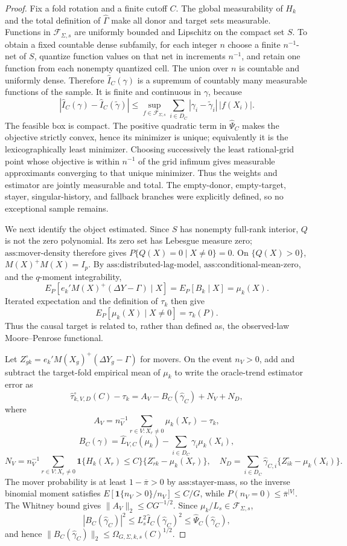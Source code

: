 \documentclass{article}
\begin{document}
\begin{proof}
Fix a fold rotation and a finite cutoff \(C\). The global measurability of \(H_k\) and the total definition of \(\widehat\Gamma\) make all donor and target sets measurable. Functions in \(\mathcal F_{\Sigma,s}\) are uniformly bounded and Lipschitz on the compact set \(S\). To obtain a fixed countable dense subfamily, for each integer \(n\) choose a finite \(n^{-1}\)-net of \(S\), quantize function values on that net in increments \(n^{-1}\), and retain one function from each nonempty quantized cell. The union over \(n\) is countable and uniformly dense. Therefore \(\widehat I_C(\gamma)\) is a supremum of countably many measurable functions of the sample. It is finite and continuous in \(\gamma\), because
\[
|\widehat I_C(\gamma)-\widehat I_C(\widetilde\gamma)|
\le \sup_{f\in\mathcal F_{\Sigma,s}}\sum_{i\in D_C}|\gamma_i-\widetilde\gamma_i|\,|f(X_i)|.
\]
The feasible box is compact. The positive quadratic term in \(\widehat\Psi_C\) makes the objective strictly convex, hence its minimizer is unique; equivalently it is the lexicographically least minimizer. Choosing successively the least rational-grid point whose objective is within \(n^{-1}\) of the grid infimum gives measurable approximants converging to that unique minimizer. Thus the weights and estimator are jointly measurable and total. The empty-donor, empty-target, stayer, singular-history, and fallback branches were explicitly defined, so no exceptional sample remains.

We next identify the object estimated. Since \(S\) has nonempty full-rank interior, \(Q\) is not the zero polynomial. Its zero set has Lebesgue measure zero; \(\text{ass:mover-density}\) therefore gives \(P\{Q(X)=0\mid X\ne0\}=0\). On \(\{Q(X)>0\}\), \(M(X)^+M(X)=I_p\). By \(\text{ass:distributed-lag-model}\), \(\text{ass:conditional-mean-zero}\), and the \(q\)-moment integrability,
\[
E_P[e_k'M(X)^+(\Delta Y-\Gamma)\mid X]
=E_P[B_k\mid X]=\mu_k(X).
\]
Iterated expectation and the definition of \(\tau_k\) then give
\[
E_P[\mu_k(X)\mid X\ne0]=\tau_k(P).
\]
Thus the causal target is related to, rather than defined as, the observed-law Moore--Penrose functional.

Let \(Z_{gk}^{\circ}=e_k'M(X_g)^+(\Delta Y_g-\Gamma)\) for movers. On the event \(n_V>0\), add and subtract the target-fold empirical mean of \(\mu_k\) to write the oracle-trend estimator error as
\[
\widehat\tau_{k,V,D}^{\circ}(C)-\tau_k
=A_V-B_C(\widehat\gamma_C)+N_V+N_D,
\]
where
\[
A_V=n_V^{-1}\sum_{r\in V:X_r\ne0}\mu_k(X_r)-\tau_k,
\]
\[
B_C(\gamma)=\widehat L_{V,C}(\mu_k)-\sum_{i\in D_C}\gamma_i\mu_k(X_i),
\]
\[
N_V=n_V^{-1}\sum_{r\in V:X_r\ne0}\mathbf 1\{H_k(X_r)\le C\}\{Z_{rk}^{\circ}-\mu_k(X_r)\},
\quad
N_D=\sum_{i\in D_C}\widehat\gamma_{C,i}\{Z_{ik}^{\circ}-\mu_k(X_i)\}.
\]
The mover probability is at least \(1-\overline\pi>0\) by \(\text{ass:stayer-mass}\), so the inverse binomial moment satisfies \(E[\mathbf 1\{n_V>0\}/n_V]\le C/G\), while \(P(n_V=0)\le\overline\pi^{|V|}\). The Whitney bound gives \(\|A_V\|_2\le C G^{-1/2}\). Since \(\mu_k/L_s\in\mathcal F_{\Sigma,s}\),
\[
|B_C(\widehat\gamma_C)|^2
\le L_s^2\widehat I_C(\widehat\gamma_C)^2
\le\widehat\Psi_C(\widehat\gamma_C),
\]
and hence \(\|B_C(\widehat\gamma_C)\|_2\le\Omega_{G,\Sigma,k,s}(C)^{1/2}\).


\end{proof}
\end{document}
